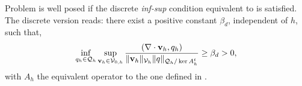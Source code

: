 Problem  is well posed if the discrete \textit{inf-sup} condition equivalent to  is satisfied. The discrete version reads: there exist a positive constant $ \beta_d $, independent of $ h $, such that,
\begin{equation}
\label{eq-C2_lbb_discrete}
\inf_{q_h\in\mathcal{Q}_h}\sup_{{\bf v}_h\in\mathcal{V}_{0,h}} \frac{(\nabla\cdot{\bf v}_h,q_h)}{\|{\bf v}_h\|_{\mathcal{V}_h}\|q\|_{\mathcal{Q}_h/\ker A_h^t}}\ge\beta_d>0,
\end{equation}
with $ A_h $ the equivalent operator to the one defined in .

